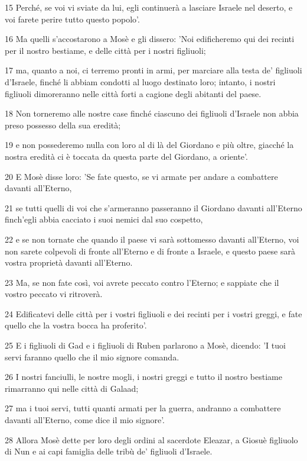 \par 15 Perché, se voi vi sviate da lui, egli continuerà a lasciare Israele nel deserto, e voi farete perire tutto questo popolo'.
\par 16 Ma quelli s'accostarono a Mosè e gli dissero: 'Noi edificheremo qui dei recinti per il nostro bestiame, e delle città per i nostri figliuoli;
\par 17 ma, quanto a noi, ci terremo pronti in armi, per marciare alla testa de' figliuoli d'Israele, finché li abbiam condotti al luogo destinato loro; intanto, i nostri figliuoli dimoreranno nelle città forti a cagione degli abitanti del paese.
\par 18 Non torneremo alle nostre case finché ciascuno dei figliuoli d'Israele non abbia preso possesso della sua eredità;
\par 19 e non possederemo nulla con loro al di là del Giordano e più oltre, giacché la nostra eredità ci è toccata da questa parte del Giordano, a oriente'.
\par 20 E Mosè disse loro: 'Se fate questo, se vi armate per andare a combattere davanti all'Eterno,
\par 21 se tutti quelli di voi che s'armeranno passeranno il Giordano davanti all'Eterno finch'egli abbia cacciato i suoi nemici dal suo cospetto,
\par 22 e se non tornate che quando il paese vi sarà sottomesso davanti all'Eterno, voi non sarete colpevoli di fronte all'Eterno e di fronte a Israele, e questo paese sarà vostra proprietà davanti all'Eterno.
\par 23 Ma, se non fate così, voi avrete peccato contro l'Eterno; e sappiate che il vostro peccato vi ritroverà.
\par 24 Edificatevi delle città per i vostri figliuoli e dei recinti per i vostri greggi, e fate quello che la vostra bocca ha proferito'.
\par 25 E i figliuoli di Gad e i figliuoli di Ruben parlarono a Mosè, dicendo: 'I tuoi servi faranno quello che il mio signore comanda.
\par 26 I nostri fanciulli, le nostre mogli, i nostri greggi e tutto il nostro bestiame rimarranno qui nelle città di Galaad;
\par 27 ma i tuoi servi, tutti quanti armati per la guerra, andranno a combattere davanti all'Eterno, come dice il mio signore'.
\par 28 Allora Mosè dette per loro degli ordini al sacerdote Eleazar, a Giosuè figliuolo di Nun e ai capi famiglia delle tribù de' figliuoli d'Israele.
